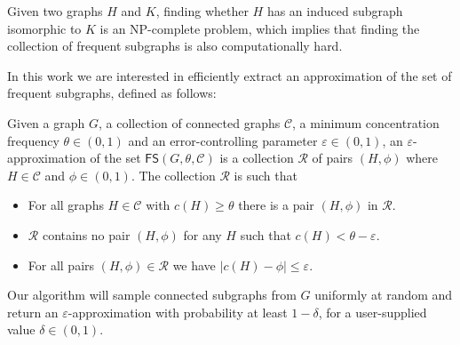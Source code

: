 Given two graphs $H$ and $K$, finding whether $H$ has an induced subgraph
isomorphic to $K$ is an NP-complete problem, which implies that finding the
collection of frequent subgraphs is also computationally hard.

In this work we are interested in efficiently extract an approximation of the
set of frequent subgraphs, defined as follows:
\begin{definition}\label{def:grapheapprox}
  Given a graph $G$, a collection of connected graphs $\mathcal{C}$, a minimum
  concentration frequency $\theta\in(0,1)$ and an error-controlling parameter
  $\varepsilon\in(0,1)$, an $\varepsilon$-approximation of the set
  $\mathsf{FS}(G,\theta,\mathcal{C})$ is a collection $\mathcal{R}$ of pairs
  $(H,\phi)$ where $H\in\mathcal{C}$ and $\phi\in(0,1)$. The collection
  $\mathcal{R}$ is such that
  \begin{itemize}
    \item For all graphs $H\in\mathcal{C}$ with $c(H)\ge\theta$ there is a pair
      $(H,\phi)$ in $\mathcal{R}$.
    \item $\mathcal{R}$ contains no pair $(H,\phi)$ for any $H$ such that
      $c(H)<\theta-\varepsilon$.
    \item For all pairs $(H,\phi)\in\mathcal{R}$ we have $|c(H)-\phi|\le\varepsilon$.
  \end{itemize}
\end{definition}
Our algorithm will sample connected subgraphs from $G$ uniformly at random and
return an $\varepsilon$-approximation with probability at least $1-\delta$, for
a user-supplied value $\delta\in(0,1)$.

